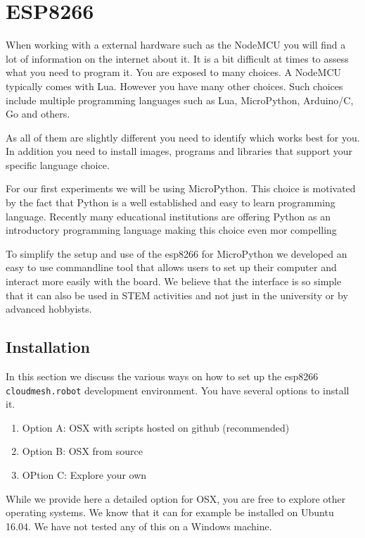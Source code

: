 \FILENAME

\section{ESP8266}\label{esp8266}

When working with a external hardware such as the NodeMCU you will find
a lot of information on the internet about it. It is a bit difficult at
times to assess what you need to program it. You are exposed to many
choices. A NodeMCU typically comes with Lua. However you have many other
choices. Such choices include multiple programming languages such as
Lua, MicroPython, Arduino/C, Go and others.

As all of them are slightly different you need to identify which works
best for you. In addition you need to install images, programs and
libraries that support your specific language choice.

For our first experiments we will be using MicroPython. This choice is
motivated by the fact that Python is a well established and easy to
learn programming language. Recently many educational institutions are
offering Python as an introductory programming language making this
choice even mor compelling

To simplify the setup and use of the esp8266 for MicroPython we
developed an easy to use commandline tool that allows users to set up
their computer and interact more easily with the board. We believe that
the interface is so simple that it can also be used in STEM activities
and not just in the university or by advanced hobbyists.

\subsection{Installation}\label{installation}

In this section we discuss the various ways on how to set up the esp8266
\texttt{cloudmesh.robot} development environment. You have several
options to install it.

\begin{enumerate}
\def\labelenumi{\arabic{enumi}.}
\tightlist
\item
  Option A: OSX with scripts hosted on github (recommended)
\item
  Option B: OSX from source
\item
  OPtion C: Explore your own
\end{enumerate}

While we provide here a detailed option for OSX, you are free to explore
other operating systems. We know that it can for example be installed on
Ubuntu 16.04. We have not tested any of this on a Windows machine.

